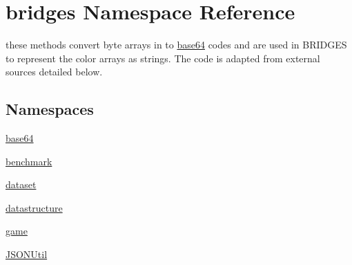 \hypertarget{namespacebridges}{}\section{bridges Namespace Reference}
\label{namespacebridges}


these methods convert byte arrays in to \hyperlink{namespacebridges_1_1base64}{base64} codes and are used in B\+R\+I\+D\+G\+ES to represent the color arrays as strings. The code is adapted from external sources detailed below.  


\subsection*{Namespaces}
\begin{DoxyCompactItemize}
\item 
 \hyperlink{namespacebridges_1_1base64}{base64}
\item 
 \hyperlink{namespacebridges_1_1benchmark}{benchmark}
\item 
 \hyperlink{namespacebridges_1_1dataset}{dataset}
\item 
 \hyperlink{namespacebridges_1_1datastructure}{datastructure}
\item 
 \hyperlink{namespacebridges_1_1game}{game}
\item 
 \hyperlink{namespacebridges_1_1_j_s_o_n_util}{J\+S\+O\+N\+Util}
\end{DoxyCompactItemize}
